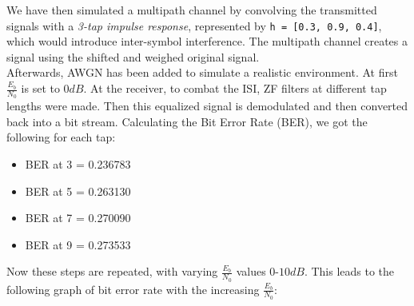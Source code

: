 \documentclass{article}
\begin{document}
        We have then simulated a multipath channel by convolving the transmitted signals with a \textit{3-tap impulse response}, represented by \texttt{h = [0.3, 0.9, 0.4]}, which would introduce inter-symbol interference. The multipath channel creates a signal using the shifted and weighed original signal.\\

        Afterwards, AWGN has been added to simulate a realistic environment. At first \(\frac{E_b}{N_0}\) is set to \(0 dB\). At the receiver, to combat the ISI, ZF filters at different tap lengths were made. Then this equalized signal is demodulated and then converted back into a bit stream. Calculating the Bit Error Rate (BER), we got the following for each tap:

        \begin{itemize}
            \item BER at 3 = 0.236783
            \item BER at 5 = 0.263130
            \item BER at 7 = 0.270090
            \item BER at 9 = 0.273533
        \end{itemize}

        Now these steps are repeated, with varying \(\frac{E_b}{N_0}\) values \(0\)-\(10 dB\). This leads to the following graph of bit error rate with the increasing \(\frac{E_b}{N_0}\):

        \begin{figure}[!htb]
                \centering
        \end{figure}
\end{document}
